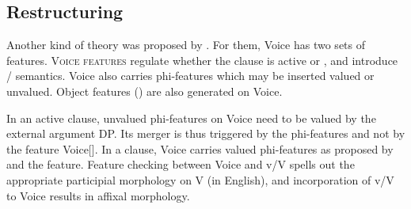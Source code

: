 \begin{exe}
\begin{xlist}
\begin{xlist}
\begin{xlist}
\begin{xlist}
\begin{xlist}
\begin{xlist}
\begin{exe}
\begin{xlist}
\begin{exe}
\begin{exe}
\begin{xlist}
\begin{exe}
\begin{exe}
\begin{xlist}
\begin{exe}
\begin{xlist}
\begin{exe}
\begin{xlist}
\begin{exe}
\begin{xlist}
\begin{exe}
\begin{xlist}
\begin{exe}
\begin{xlist}
\begin{exe}
\begin{xlist}
	\subsection{Restructuring}
Another kind of theory was proposed by \cite{wurmbrandshimamura17}. For them, Voice has two sets of features. \textsc{Voice features} regulate whether the clause is active or , and introduce / semantics. Voice also carries phi-features which may be inserted valued or unvalued. Object  features () are also generated on Voice.

In an active clause, unvalued phi-features on Voice need to be valued by the external argument DP. Its merger is thus triggered by the phi-features and not by the feature Voice[]. In a  clause, Voice carries valued phi-features as proposed by~\cite{legate14} and the  feature. Feature checking between Voice and v/V spells out the appropriate participial morphology on V (in English), and incorporation of v/V to Voice results in affixal morphology.


\end{xlist}
\end{exe}
\end{xlist}
\end{exe}
\end{xlist}
\end{exe}
\end{xlist}
\end{exe}
\end{xlist}
\end{exe}
\end{xlist}
\end{exe}
\end{xlist}
\end{exe}
\end{exe}
\end{xlist}
\end{exe}
\end{exe}
\end{xlist}
\end{exe}
\end{xlist}
\end{xlist}
\end{xlist}
\end{xlist}
\end{xlist}
\end{xlist}
\end{exe}
